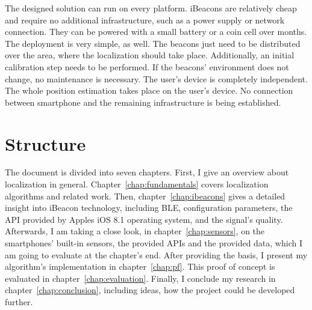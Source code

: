 The designed solution can run on every platform. iBeacons are relatively cheap and require no additional infrastructure, such as a power supply or network connection. They can be powered with a small battery or a coin cell over months. The deployment is very simple, as well. The beacons just need to be distributed over the area, where the localization should take place. Additionally, an initial calibration step needs to be performed. If the beacons' environment does not change, no maintenance is necessary. The user's device is completely independent. The whole position estimation takes place on the user's device. No connection between smartphone and the remaining infrastructure is being established.


\section{Structure}
The document is divided into seven chapters. First, I give an overview about localization in general. Chapter~\ref{chap:fundamentals} covers localization algorithms and related work. Then, chapter~\ref{chap:ibeacons} gives a detailed insight into iBeacon technology, including \acl{BLE}, configuration parameters, the \acs{API} provided by Apples iOS 8.1 operating system, and the signal's quality. Afterwards, I am taking a close look, in chapter~\ref{chap:sensors}, on the smartphones' built-in sensors, the provided \acsp{API} and the provided data, which I am going to evaluate at the chapter's end. After providing the basis, I present my algorithm's implementation in chapter~\ref{chap:pf}. This proof of concept is evaluated in chapter~\ref{chap:evaluation}. Finally, I conclude my research in chapter~\ref{chap:conclusion}, including ideas, how the project could be developed further.
